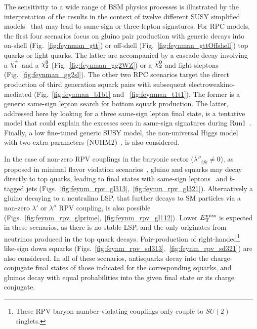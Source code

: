 \documentclass{outhesis}
\begin{document}
The sensitivity to a wide range of BSM physics processes is illustrated by the interpretation of the results  
in the context of twelve different SUSY simplified models~\cite{Alwall:2008ve,Alwall:2008ag,Alves:2011wf} 
that may lead to same-sign or three-lepton signatures. 
For RPC models, the first four scenarios focus on gluino pair production with generic decays into on-shell (Fig.~\ref{fig:feynman_gtt}) 
or off-shell (Fig.~\ref{fig:feynman_gttOffshell}) top quarks or light quarks. The latter are accompanied by a cascade decay involving 
a $\chinoonepm$ and a $\ninotwo$ (Fig.~\ref{fig:feynman_gg2WZ}) or a $\ninotwo$ and light sleptons (Fig.~\ref{fig:feynman_gg2sl}). 
The other two RPC scenarios target the direct production of third generation squark pairs 
with subsequent electroweakino-mediated (Fig.~\ref{fig:feynman_b1b1} and ~\ref{fig:feynman_t1t1}). 
The former is a generic same-sign lepton search for bottom squark production. The latter, addressed here by looking for a three same-sign lepton final state, 
is a tentative model that could explain the excesses seen in same-sign signatures during Run1~\cite{Huang:2015fba}.
Finally, a low fine-tuned generic SUSY model, the non-universal Higgs model with two extra parameters (NUHM2)~\cite{Ellis:2002iu,Ellis:2002wv}, 
is also considered. 


In the case of non-zero RPV couplings in the baryonic sector ($\lambda''_{ijk}\neq 0$),
as proposed in minimal flavor violation scenarios~\cite{Nikolidakis:2007fc,Smith:2008ju,Csaki:2011ge},
gluino and squarks may decay directly to top quarks, leading to final states with same-sign leptons~\cite{Durieux:2013uqa,Berger:2013sir} 
and $b$-tagged jets (Figs.~\ref{fig:feynm_rpv_gl313},~\ref{fig:feynm_rpv_gl321}).
Alternatively a gluino decaying to a neutralino LSP, that further decays to SM particles via a non-zero $\lambda'$ or $\lambda''$ RPV coupling, 
is also possible (Figs.~\ref{fig:feynm_rpv_glprime},~\ref{fig:feynm_rpv_gl112}).  
Lower $E_{\mathrm{T}}^{\mathrm{miss}}$ is expected in these scenarios, as there is no stable LSP, and the only \met originates from neutrinos produced in the top quark decays.
Pair-production of right-handed\footnote{These RPV baryon-number-violating couplings only couple to $SU(2)$ singlets.} 
like-sign down squarks (Figs.~\ref{fig:feynm_rpv_sd313},~\ref{fig:feynm_rpv_sd321}) are also considered.
In all of these scenarios, antisquarks decay into the charge-conjugate final states of those indicated for the corresponding squarks, 
and gluinos decay with equal probabilities into the given final state or its charge conjugate.
\end{document}
